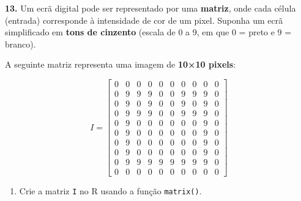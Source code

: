 \documentclass[
]{book}
\providecommand{\tightlist}{%
  \setlength{\itemsep}{0pt}\setlength{\parskip}{0pt}}
\begin{document}
\textbf{13.} Um ecrã digital pode ser representado por uma \textbf{matriz}, onde cada célula (entrada) corresponde à intensidade de cor de um pixel. Suponha um ecrã simplificado em \textbf{tons de cinzento} (escala de 0 a 9, em que 0 = preto e 9 = branco).

A seguinte matriz representa uma imagem de \textbf{10×10 pixels}:

\[
I =
\begin{bmatrix}
0 & 0 & 0 & 0 & 0 & 0 & 0 & 0 & 0 & 0 \\
0 & 9 & 9 & 9 & 0 & 0 & 9 & 9 & 9 & 0 \\
0 & 9 & 0 & 9 & 0 & 0 & 9 & 0 & 9 & 0 \\
0 & 9 & 9 & 9 & 0 & 0 & 9 & 9 & 9 & 0 \\
0 & 9 & 0 & 0 & 0 & 0 & 0 & 0 & 9 & 0 \\
0 & 9 & 0 & 0 & 0 & 0 & 0 & 0 & 9 & 0 \\
0 & 9 & 0 & 0 & 0 & 0 & 0 & 0 & 9 & 0 \\
0 & 9 & 0 & 0 & 0 & 0 & 0 & 0 & 9 & 0 \\
0 & 9 & 9 & 9 & 9 & 9 & 9 & 9 & 9 & 0 \\
0 & 0 & 0 & 0 & 0 & 0 & 0 & 0 & 0 & 0
\end{bmatrix}
\]

\begin{enumerate}
\def\labelenumi{(\alph{enumi})}
\tightlist
\item
  Crie a matriz \texttt{I} no R usando a função \texttt{matrix()}.
\end{enumerate}
\end{document}
